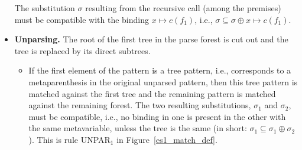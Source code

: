 \begin{itemize}
\begin{itemize}
    \end{itemize}
    The substitution \(\sigma\) resulting from the recursive call
    (among the premises) must be compatible with the binding \(x
    \mapsto c(f_1)\), i.e., \(\sigma \subseteq \sigma \oplus x \mapsto
    c(f_1)\).

  \item \textbf{Unparsing.} The root of the first tree in the parse
  forest is cut out and the tree is replaced by its direct
  subtrees.
    \begin{itemize}

      \item If the first element of the pattern is a tree pattern,
      i.e., corresponds to a meta\-parenthesis in the original
      unparsed pattern, then this tree pattern is matched against the
      first tree and the remaining pattern is matched against the
      remaining forest. The two resulting substitutions, \(\sigma_1\)
      and \(\sigma_2\), must be compatible, i.e., no binding in one is
      present in the other with the same meta\-variable, unless the
      tree is the same (in short: \(\sigma_1 \subseteq \sigma_1 \oplus
      \sigma_2\)). This is rule \textsf{UNPAR}\(_1\) in
      Figure~\ref{es1_match_def}.
\begin{figure}[t]
\end{figure}
\end{itemize}
\end{itemize}
